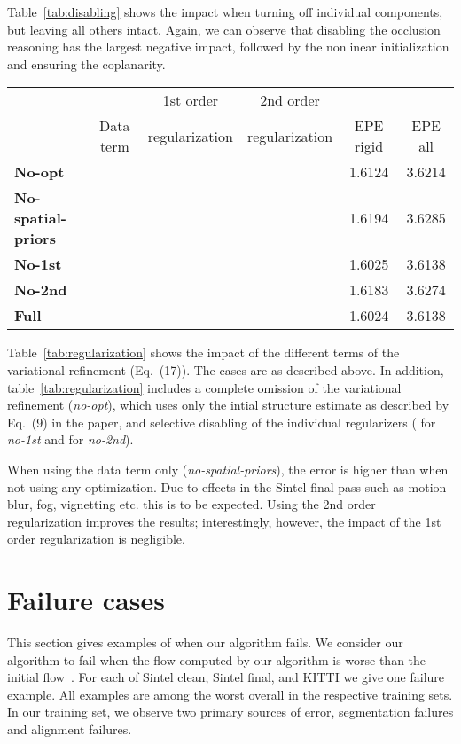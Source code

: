 \documentclass[10pt,twocolumn,letterpaper]{article}
\begin{document}
Table~\ref{tab:disabling} shows the impact when turning off individual components, but leaving all others intact.
Again, we can observe that disabling the occlusion reasoning has the largest negative impact, followed by the nonlinear initialization and ensuring the coplanarity.


\begin{table*}[h!]
\centering
\begin{tabular}{lccccc}
\toprule
& & 1st order & 2nd order & & \\
& Data term & regularization & regularization & EPE rigid & EPE all \\
\midrule
\textbf{No-opt} &  &  &  & 1.6124 & 3.6214 \\
\textbf{No-spatial-priors} &  &  &  & 1.6194 & 3.6285 \\
\textbf{No-1st} &  &  &  & 1.6025 & 3.6138 \\
\textbf{No-2nd} &  &  &  & 1.6183 & 3.6274 \\
\textbf{Full} &  &  &  & 1.6024 & 3.6138 \\
\bottomrule
\end{tabular}
\caption{Influence of regularization terms}
\label{tab:regularization}
\end{table*}

Table~\ref{tab:regularization} shows the impact of the different terms of the variational refinement (Eq.~(17)).
The cases are as described above.
In addition, table~\ref{tab:regularization} includes a complete omission of the variational refinement (\textit{no-opt}), which uses only the intial structure estimate as described by Eq.~(9) in the paper, and selective disabling of the individual regularizers ( for \textit{no-1st} and  for \textit{no-2nd}).

When using the data term only (\textit{no-spatial-priors}), the error is higher than when not using any optimization.
Due to effects in the Sintel final pass such as motion blur, fog, vignetting etc. this is to be expected.
Using the 2nd order regularization improves the results; interestingly, however, the impact of the 1st order regularization is negligible.




 \section{Failure cases}
\newcommand{\failurewidth}{0.3\textwidth}
This section gives examples of when our algorithm fails.
We consider our algorithm to fail when the flow computed by our algorithm is worse than the initial flow~\cite{Menze2015GCPR}.
For each of Sintel clean, Sintel final, and KITTI we give one failure example.
All examples are among the worst overall in the respective training sets.
In our training set, we observe two primary sources of error, segmentation failures and alignment failures.
\end{document}

